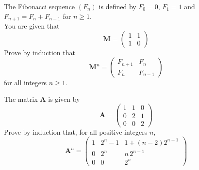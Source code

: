 \documentclass[leqno]{article}
\begin{document}
\begin{enumerate}[
  label=\textbf{\arabic*.},
  leftmargin=*,
  topsep=0pt,
  partopsep=0pt,
  parsep=0pt
]
\newpage

\questionitem

The Fibonacci sequence $(F_n)$ is defined by $F_0=0$, $F_1=1$ and $F_{n+1}=F_n+F_{n-1}$ for $n\geq 1$. \\
You are given that
\[
\mathbf{M} = \begin{pmatrix} 1 & 1 \\ 1 & 0 \end{pmatrix}
\]
Prove by induction that
\[
\mathbf{M}^n = \begin{pmatrix} F_{n+1} & F_n \\ F_n & F_{n-1} \end{pmatrix}
\]
for all integers $n \geq 1$.  \\

\newpage

\questionitem

The matrix $\mathbf{A}$ is given by
\[
\mathbf{A} = \begin{pmatrix}
1 & 1 & 0 \\
0 & 2 & 1 \\
0 & 0 & 2
\end{pmatrix}
\]
Prove by induction that, for all positive integers $n$,
\[
\renewcommand{\arraystretch}{1.4}
\mathbf{A}^n = \begin{pmatrix}
1 & 2^n - 1 & 1 + (n-2)2^{n-1} \\
0 & 2^n & n\,2^{n-1} \\
0 & 0 & 2^n
\end{pmatrix}
\]


\end{enumerate}
\end{document}
